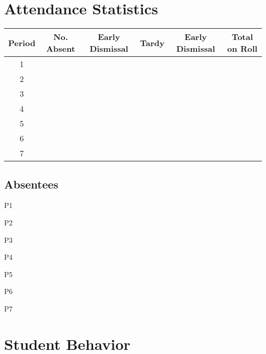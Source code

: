 \documentclass[10pt]{article}
\newcommand{\rulers}{\uline{\hfill\null }}
\begin{document}
\vspace{0.1in}

\section*{Attendance Statistics}

\begin{tabular}{|c|c|c|c|c|c|}
\hline 
\rule[-1ex]{0pt}{4.5ex} Period & No. Absent & Early Dismissal & Tardy & Early Dismissal & Total on Roll \\ 
\hline 
\rule[-1ex]{0pt}{4.5ex} 1 &  &  &  &  &  \\ 
\hline 
\rule[-1ex]{0pt}{4.5ex} 2 &  &  &  &  &  \\ 
\hline 
\rule[-1ex]{0pt}{4.5ex} 3 &  &  &  &  &  \\ 
\hline 
\rule[-1ex]{0pt}{4.5ex} 4 &  &  &  &  &  \\ 
\hline 
\rule[-1ex]{0pt}{4.5ex} 5 &  &  &  &  &  \\ 
\hline 
\rule[-1ex]{0pt}{4.5ex} 6 &  &  &  &  &  \\ 
\hline 
\rule[-1ex]{0pt}{4.5ex} 7 &  &  &  &  &  \\ 
\hline 
\end{tabular} 

\vspace{.1in}
\subsection*{Absentees}
\begin{framed}
\begin{description}
    \item[\small{P1}] \rulers
    \item[\small{P2}] \rulers
    \item[\small{P3}] \rulers
    \item[\small{P4}] \rulers
    \item[\small{P5}] \rulers
    \item[\small{P6}] \rulers
    \item[\small{P7}] \rulers
\end{description}
\vspace{.1in}
\end{framed}

\section*{Student Behavior}
\end{document}
